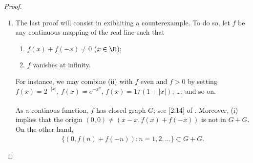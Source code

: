 \begin{proof}
\begin{enumerate}
The result will be established by showing that $c$ is not in the closure %
of $A+B$. \\
\\
To do so, we let the variable $\mathit{a}$ range over $A$: %
Every set $a+B$ is closed as well; see Section 1.7 of \cite{FA}. %
%
Trivially, $a+B \neq c$: By Section 1.10 of \cite{FA}, %
there so exists $V=V(a)$ a neighborhood of the origin such that %
%
\begin{align}\label{separation}
  (a+B + V) \cap (c+V) = \emptyset.
\end{align}
%
Moreover, there are finitely many $a+V$, say $a_1 + V_1, a_2 + V_2, \dots$, %
whose union $U$ contains the compact set $A$. Therefore, %
%
\begin{align}\label{U + B encloses A + B}
  A+B \subset U + B.
\end{align}
%
Now define %
\begin{align}
  W \triangleq V_1 \cap V_2 \cap \cdots, 
\end{align}
%
so that 
%
\begin{align}
  (a_i + B + V_i) \cap (c + W) \overset{(\ref{separation})}{=} \emptyset %
  \quad (i = 1, 2, \dots).
\end{align}
%
As a conclusion, $c$ is not in the closure of $U+B$. %
Finally, (\ref{U + B encloses A + B}) asserts that %
$c$ is not in $\overline{A+B}$ either; which achieves the proof. \\
\\
\textbf{Corollary}: If $B$ is the closure of a set $S$, then %
%
\begin{align}
  A+B \subset \overline{A+S} \subset \overline{A+B} = A + B
\end{align}
%
by (b) of Section 1.13 of \cite{FA} (since $A$ is closed; %
see Section 1.12, from the same source). %
The special case $A = \{x\}$, $B=X$ %
will occur in the proof of Exercise 15 in chapter 2. %
%
\item The last proof will consist in exibhiting a counterexample. %
To do so, let $f$ be any continuous mapping of the real line such that %
\renewcommand{\labelenumii}{(\roman{enumii})} 
\begin{enumerate}
  \item $f(x) + f(\minus x) \neq 0$ \quad ($x \in \R$);
  \item $f$ vanishes at infinity. 
\end{enumerate}
For instance, we may combine (ii) with $f$ even and $f>0$ by setting %
%
  $f(x) = 2^{\minus |x|}$, %
  $f(x) = e^{\minus x^2}$, %
  $f(x) = 1/(1+|x|)$, \dots, %
%
and so on. \\
\\
As a continous function, $f$ has closed graph $G$; see [2.14] of \cite{FA}. %
%
Moreover, (i) implies that the origin %
%
  $(0, 0) \neq \left(x-x, f(x)+ f(\minus x)\right)$ %
% 
is not in $G+G$. %
%
On the other hand, 
%
\begin{align}
  \{ \left(0, f(n) + f(\minus n)\right): n=1, 2, \dots\} \subset G + G.
\end{align}
%


\end{enumerate}
\end{proof}

